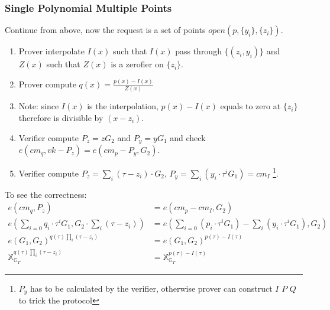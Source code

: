 \documentclass[10pt]{article}
\begin{document}
\subsubsection{Single Polynomial Multiple Points}
Continue from above, now the request is a set of points $open(p, \{y_i\}, \{z_i\})$.
\begin{enumerate}
    \item Prover interpolate $I(x)$ such that $I(x)$ pass through $\{(z_i, y_i)\}$
        and $Z(x)$ such that $Z(x)$ is a zerofier on $\{z_i\}$.
    \item Prover compute $q(x) = \frac{p(x) - I(x)}{Z(x)}$
    \item Note: since $I(x)$ is the interpolation, $p(x) - I(x)$ equals to zero at
        $\{z_i\}$ therefore is divisible by $(x - z_i)$.
    \item Verifier compute $P_z = zG_2$ and $P_y = yG_1$ and check 
        $e({cm}_q, vk-P_z) = e({cm}_p-P_y, G_2)$.
    \item Verifier compute $P_z = \sum_i{(\tau - z_i )}\cdot G_2$, $P_y =
        \sum_i{(y_i\cdot\tau^{i}G_1)} = cm_{I}$ \footnote{$P_y$ has to be
        calculated by the verifier, otherwise prover can construct $I$ $P$ $Q$
    to trick the protocol}.
\end{enumerate}
To see the correctness:
\[
\begin{aligned}
    e({cm}_q, P_z) &= e({cm}_p-{cm}_I, G_2)\\
    e(\sum_{i=0}q_i \cdot \tau^iG_1, G_2 \cdot \sum_i{(\tau - z_i)}) 
                   &= e(\sum_{i=0}(p_i \cdot \tau^iG_1)-
                   \sum_i{(y_i\cdot\tau^{i}G_1)}, G_2)\\
    e(G_1, G_2)^{q(\tau)\prod_i{(\tau - z_i)}} &= e(G_1,G_2)^{p(\tau)-I(\tau)}\\
    \mathbb{X}^{q(\tau)\prod_i{(\tau - z_i)}}_{\mathbb{G}_T} &= \mathbb{X}^{p(\tau)-I(\tau)}_{\mathbb{G}_T}
\end{aligned}
\]
\end{document}
